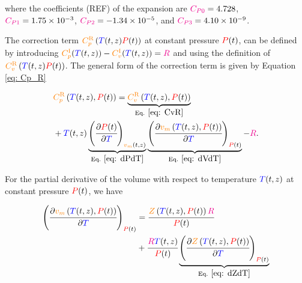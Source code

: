\documentclass[../Article_Model_Parameters.tex]{subfiles}
\begin{document}
	where the coefficients ({\color{red}REF}) of the expansion are ${\color{magenta}C_{P0}} = 4.728$, ${\color{magenta}C_{P1}} = 1.75 \times 10^{-3}$, ${\color{magenta}C_{P2}} = -1.34 \times 10^{-5}$, and ${\color{magenta}C_{P3}} = 4.10 \times 10^{-9}$. 
	
	The correction term ${\color{orange}C_p^{\text{R}}}\left({\color{blue}T}(t,z){\color{red}P}(t)\right)$ at constant pressure ${\color{red}P}(t)$, can be defined by introducing  ${\color{orange}C_p^{\text{I}}}({\color{blue}T}(t,z)) - {\color{orange}C_v^{\text{I}}}({\color{blue}T}(t,z)) = {\color{magenta}R}$ and using the definition of ${\color{orange}C_v^{\text{R}}}\left({\color{blue}T}(t,z){\color{red}P}(t)\right)$. The general form of the correction term is given by Equation \ref{eq: Cp_R}
	
	{\footnotesize	
	\begin{align}
		&{\color{orange}C_p^{\text{R}}}\left({\color{blue}T}(t,z), {\color{red}P}(t)\right) = \underbrace{{\color{orange}C_v^{\text{R}}}\left({\color{blue}T}(t,z), {\color{red}P}(t)\right)}_{\text{Eq. }\eqref{eq: CvR}} \nonumber \\
		&+ {\color{blue}T}(t,z) \underbrace{\left(\cfrac{\partial {\color{red}P}(t)}{\partial {\color{blue}T}}\right)_{{\color{orange}v_m}(t,z)}}_{\text{Eq. } \eqref{eq: dPdT}} \underbrace{\left(\cfrac{\partial {\color{orange}v_m}\left({\color{blue}T}(t,z),{\color{red}P}(t)\right)}{\partial {\color{blue}T}}\right)_{{\color{red}P}(t)}}_{\text{Eq. } \eqref{eq: dVdT}} - {\color{magenta}R}. \label{eq: Cp_R} 
	\end{align} }

	
	For the partial derivative of the volume with respect to temperature ${\color{blue}T}(t,z)$ at constant pressure ${\color{red}P}(t)$, we have

	{\footnotesize
	\begin{align}
		\left( \cfrac{\partial {\color{orange}v_m}\left({\color{blue}T}(t,z), {\color{red}P}(t)\right)}{\partial {\color{blue}T}} \right)_{{\color{red}P}(t)} &= \cfrac{{\color{orange}Z}\left({\color{blue}T}(t,z), {\color{red}P}(t)\right) {\color{magenta}R}}{{\color{red}P}(t)} \nonumber \\
		&+ \cfrac{{\color{magenta}R}{\color{blue}T}(t,z)}{{\color{red}P}(t)} \underbrace{\left( \cfrac{\partial {\color{orange}Z}\left({\color{blue}T}(t,z), {\color{red}P}(t)\right)}{\partial {\color{blue}T}} \right)_{{\color{red}P}(t)}}_{\text{Eq. }\eqref{eq: dZdT}} \label{eq: dVdT}
	\end{align} }
 
\end{document}
